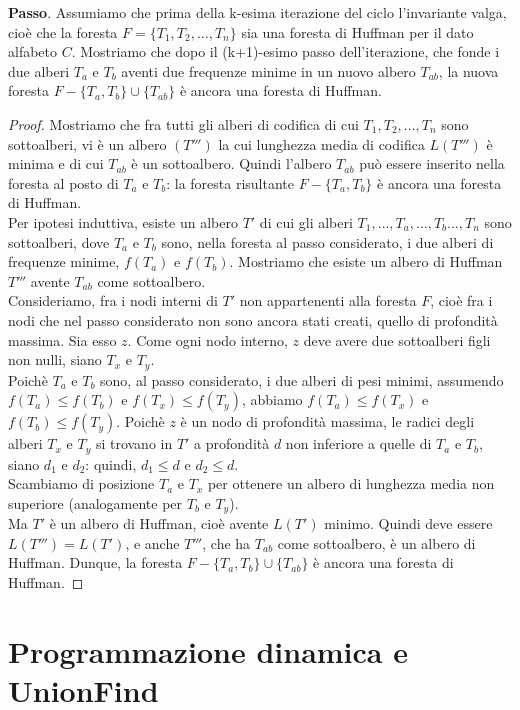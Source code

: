 \documentclass[11pt]{article}
\begin{document}
\textbf{Passo}. Assumiamo che prima della k-esima iterazione del ciclo l'invariante valga, cioè che la foresta 
$F=\{T_1,T_2,\dots,T_n\}$ sia una foresta di Huffman per il dato alfabeto $C$. Mostriamo che dopo il (k+1)-esimo passo 
dell'iterazione, che fonde i due alberi $T_a$ e $T_b$ aventi due frequenze minime in un nuovo albero $T_{ab}$, la nuova 
foresta $F-\{T_a,T_b\}\cup\{T_{ab}\}$ è ancora una foresta di Huffman.
\begin{proof}
    Mostriamo che fra tutti gli alberi di codifica di cui $T_1,T_2,\dots,T_n$ sono sottoalberi, vi è un albero $(T''')$ 
    la cui lunghezza media di codifica $L(T''')$ è minima e di cui $T_{ab}$ è un sottoalbero. Quindi l'albero $T_{ab}$ può 
    essere inserito nella foresta al posto di $T_a$ e $T_b$: la foresta risultante $F-\{T_a,T_b\}$ è ancora una foresta 
    di Huffman.\\
    Per ipotesi induttiva, esiste un albero $T'$ di cui gli alberi $T_1,\dots,T_a,\dots,T_b\dots,T_n$ sono sottoalberi, 
    dove $T_a$ e $T_b$ sono, nella foresta al passo considerato, i due alberi di frequenze minime, $f(T_a)$ e $f(T_b)$. 
    Mostriamo che esiste un albero di Huffman $T'''$ avente $T_{ab}$ come sottoalbero.\\
    Consideriamo, fra i nodi interni di $T'$ non appartenenti alla foresta $F$, cioè fra i nodi che nel passo considerato 
    non sono ancora stati creati, quello di profondità massima. Sia esso $z$. Come ogni nodo interno, $z$ deve avere due 
    sottoalberi figli non nulli, siano $T_x$ e $T_y$.\\
    Poichè $T_a$ e $T_b$ sono, al passo considerato, i due alberi di pesi minimi, assumendo $f(T_a)\leq f(T_b)$ e $f(T_x)\leq f(T_y)$,
    abbiamo $f(T_a)\leq f(T_x)$ e $f(T_b)\leq f(T_y)$. Poichè $z$ è un nodo di profondità massima, le radici degli alberi $T_x$ 
    e $T_y$ si trovano in $T'$ a profondità $d$ non inferiore a quelle di $T_a$ e $T_b$, siano $d_1$ e $d_2$: quindi, 
    $d_1\leq d$ e $d_2\leq d$.\\
    Scambiamo di posizione $T_a$ e $T_x$ per ottenere un albero di lunghezza media non superiore (analogamente per $T_b$
    e $T_y$).\\
    Ma $T'$ è un albero di Huffman, cioè avente $L(T')$ minimo. Quindi deve essere $L(T''')=L(T')$, e anche $T'''$, che 
    ha $T_{ab}$ come sottoalbero, è un albero di Huffman. Dunque, la foresta $F-\{T_a,T_b\}\cup\{T_{ab}\}$ è ancora una 
    foresta di Huffman.
\end{proof}
\section*{Programmazione dinamica e UnionFind}
\end{document}
